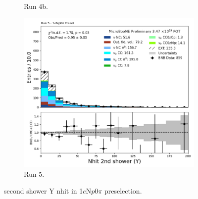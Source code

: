 \begin{figure}[H]
\begin{subfigure}[t]{0.32\linewidth}
        \caption{Run 4b.}
    \end{subfigure}%
    \hspace{0.2cm}%
    \begin{subfigure}[t]{0.32\linewidth}
        \includegraphics[width=\linewidth]{technote/Appendix_Preselection/Figures/1eNp0pi/Run5/secondshower_Y_nhit_Run5_1eNp0pi_Presel.png}
        \caption{Run 5.}
    \end{subfigure}
    \caption{second shower Y nhit in 1$e$N$p$0$\pi$ preselection.}
\end{figure}

